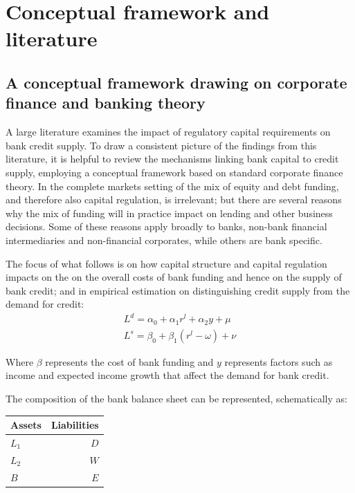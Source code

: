 \documentclass[
]{article}
\begin{document}
\hypertarget{literature}{%
\section{Conceptual framework and literature}\label{literature}}

\hypertarget{a-conceptual-framework-drawing-on-corporate-finance-and-banking-theory}{%
\subsection{A conceptual framework drawing on corporate finance and banking theory}\label{a-conceptual-framework-drawing-on-corporate-finance-and-banking-theory}}

A large literature examines the impact of regulatory capital requirements on bank credit supply. To draw a consistent picture of the findings from this literature, it is helpful to review the mechanisms linking bank capital to credit supply, employing a conceptual framework based on standard corporate finance theory. In the complete markets setting of \citet{modigliani58} the mix of equity and debt funding, and therefore also capital regulation, is irrelevant; but there are several reasons why the mix of funding will in practice impact on lending and other business decisions. Some of these reasons apply broadly to banks, non-bank financial intermediaries and non-financial corporates, while others are bank specific.

The focus of what follows is on how capital structure and capital regulation impacts on the on the overall costs of bank funding and hence on the supply of bank credit; and in empirical estimation on distinguishing credit supply from the demand for credit:
\[
\begin{split}
L^d =\alpha_0+\alpha_1 r^l+\alpha_2 y + \mu\\
L^s =\beta_0+\beta_1 (r^l-\omega)+\nu 
\end{split}
\]

Where \(\beta\) represents the cost of bank funding and \(y\) represents factors such as income and expected income growth that affect the demand for bank credit.

The composition of the bank balance sheet can be represented, schematically as:

\begin{center}
\begin{tabular}{ l | r}
Assets  & Liabilities \\
\hline
$L_1$   & $D$ \\
$L_2$   & $W$ \\
$B$ & $E$ \\
\hline
\end{tabular}
\end{center}
\end{document}
